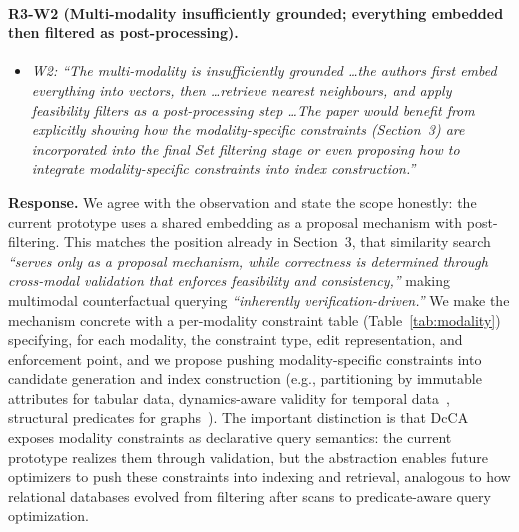\paragraph{R3-W2 (Multi-modality insufficiently grounded; everything embedded then filtered as post-processing).}

\begin{itemize}[leftmargin=1.2em, itemsep=1pt, topsep=2pt]
\item \textit{W2: ``The multi-modality is insufficiently grounded \dots the authors first embed everything into vectors, then \dots retrieve nearest neighbours, and apply feasibility filters as a post-processing step \dots The paper would benefit from explicitly showing how the modality-specific constraints (Section~3) are incorporated into the final Set filtering stage or even proposing how to integrate modality-specific constraints into index construction.''}
\end{itemize}
\smallskip

\noindent\textbf{Response.}
We agree with the observation and state the scope honestly: the current prototype uses a shared embedding as a proposal mechanism with post-filtering. This matches the position already in Section~3, that similarity search \emph{``serves only as a proposal mechanism, while correctness is determined through cross-modal validation that enforces feasibility and consistency,''} making multimodal counterfactual querying \emph{``inherently verification-driven.''} We make the mechanism concrete with a per-modality constraint table (Table~\ref{tab:modality}) specifying, for each modality, the constraint type, edit representation, and enforcement point, and we propose pushing modality-specific constraints into candidate generation and index construction (e.g., partitioning by immutable attributes for tabular data, dynamics-aware validity for temporal data~\cite{senin2008dynamic}, structural predicates for graphs~\cite{kipf2016semi}). The important distinction is that DcCA exposes modality constraints as declarative query semantics: the current prototype realizes them through validation, but the abstraction enables future optimizers to push these constraints into indexing and retrieval, analogous to how relational databases evolved from filtering after scans to predicate-aware query optimization.

